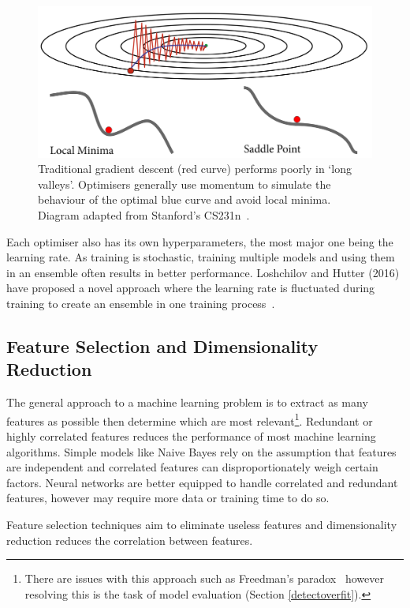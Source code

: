 \documentclass[12pt, twoside]{book}
\begin{document}
\begin{figure}[h]
	\label{cnnvis}
	\centering\includegraphics[width=0.82\linewidth]{gradescent.png}
	\caption{Traditional gradient descent (red curve) performs poorly in `long valleys'. Optimisers generally use momentum to simulate the behaviour of the optimal blue curve and avoid local minima. Diagram adapted from Stanford's CS231n~\cite{cs231n}.}
\end{figure}

Each optimiser also has its own hyperparameters, the most major one being the learning rate. As training is stochastic, training multiple models and using them in an ensemble often results in better performance. Loshchilov and Hutter (2016) have proposed a novel approach where the learning rate is fluctuated during training to create an ensemble in one training process~\cite{sgdrestarts}. 


\subsection{Feature Selection and Dimensionality Reduction}
The general approach to a machine learning problem is to extract as many features as possible then determine which are most relevant\footnote{There are issues with this approach such as Freedman's paradox~\cite{freedmanparadox} however resolving this is the task of model evaluation (Section \ref{detectoverfit}).}. Redundant or highly correlated features reduces the performance of most machine learning algorithms. Simple models like Naive Bayes rely on the assumption that features are independent and correlated features can disproportionately weigh certain factors. Neural networks are better equipped to handle correlated and redundant features, however may require more data or training time to do so. 


\begin{highlight}
	Feature selection techniques aim to eliminate useless features and dimensionality reduction reduces the correlation between features.
\end{highlight} 
\end{document}
